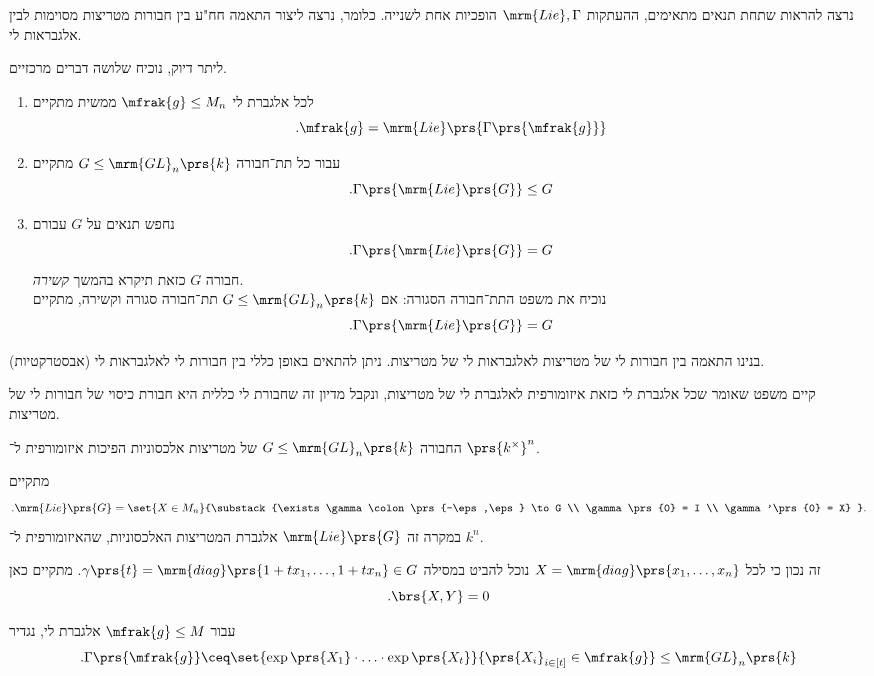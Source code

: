 \documentclass[10pt, twoside]{book}
\begin{document}
נרצה להראות שתחת תנאים מתאימים, ההעתקות
$\mrm{Lie}, \Gamma$
הופכיות אחת לשנייה.
כלומר,
נרצה ליצור התאמה חח"ע בין חבורות מטריצות מסוימות לבין אלגבראות לי.

ליתר דיוק, נוכיח שלושה דברים מרכזיים.

\begin{enumerate}
\item לכל אלגברת לי
$\mfrak{g} \leq M_n$
ממשית מתקיים
\[\text{.} \mfrak{g} = \mrm{Lie}\prs{\Gamma\prs{\mfrak{g}}}\]
\item עבור כל תת־חבורה
$G \leq \mrm{GL}_n\prs{k}$
מתקיים
\[\text{.} \Gamma\prs{\mrm{Lie}\prs{G}} \leq G\]
\item נחפש תנאים על
$G$
עבורם
\[\text{.} \Gamma\prs{\mrm{Lie}\prs{G}} = G\]
חבורה
$G$
כזאת תיקרא בהמשך
\emph{קשירה}.
\\
נוכיח את משפט התת־חבורה הסגורה:
אם
$G \leq \mrm{GL}_n\prs{k}$
תת־חבורה סגורה וקשירה, מתקיים
\[\text{.} \Gamma\prs{\mrm{Lie}\prs{G}} = G\]
\end{enumerate}

\begin{remark}
בנינו התאמה בין חבורות לי של מטריצות לאלגבראות לי של מטריצות.
ניתן להתאים באופן כללי בין חבורות לי לאלגבראות לי (אבסטרקטיות).

קיים משפט שאומר שכל אלגברת לי כזאת איזומורפית לאלגברת לי של מטריצות, ונקבל מדיון זה שחבורת לי כללית היא חבורת כיסוי של חבורות לי של מטריצות.
\end{remark}

\begin{example}
החבורה
$G \leq \mrm{GL}_n\prs{k}$
של מטריצות אלכסוניות הפיכות איזומורפית ל־%
$\prs{k^\times}^n$.

מתקיים
\[\text{.} \mrm{Lie}\prs{G} = \set{X \in M_n}{\substack{\exists \gamma \colon \prs{-\eps,\eps} \to G \\ \gamma\prs{0} = I \\ \gamma'\prs{0} = X} } \text.\]
במקרה זה
$\mrm{Lie}\prs{G}$
אלגברת המטריצות האלכסוניות, שהאיזומורפית ל־%
$k^n$.

זה נכון כי לכל
$X = \mrm{diag}\prs{x_1, \ldots, x_n}$
נוכל להביט במסילה
$\gamma\prs{t} = \mrm{diag}\prs{1 + t x_1, \ldots, 1+ t x_n} \in G$.
מתקיים כאן
\[\text{.} \brs{X,Y} = 0\]
\end{example}

\begin{definition}
עבור
$\mfrak{g} \leq M$
אלגברת לי, נגדיר
\[\text{.} \Gamma\prs{\mfrak{g}} \ceq \set{\exp\prs{X_1} \cdot \ldots \cdot \exp\prs{X_t}}{\prs{X_i}_{i \in [t]} \in \mfrak{g}} \leq \mrm{GL}_n\prs{k}\]
\end{definition}
\end{document}
